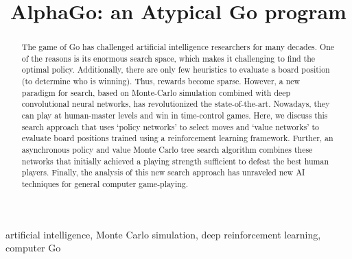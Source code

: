 \documentclass[conference]{IEEEtran}
\begin{document}
\title{AlphaGo: an Atypical Go program}


\author{
}


\maketitle

\begin{abstract}
The game of Go has challenged artificial intelligence researchers for many decades. One of the reasons is its enormous search space, which makes it challenging to find the optimal policy. Additionally, there are only few heuristics to evaluate a board position (to determine who is winning). Thus, rewards become sparse. However, a new paradigm for search, based on Monte-Carlo simulation combined with deep convolutional neural networks, has revolutionized the state-of-the-art. Nowadays, they can play at human-master levels and win in time-control games. Here, we discuss this search approach that uses `policy networks' to select moves and `value networks' to evaluate board positions trained using a reinforcement learning framework. Further, an asynchronous policy and value Monte Carlo tree search algorithm combines these networks that initially achieved a playing strength sufficient to defeat the best human players. Finally, the analysis of this new search approach has unraveled new AI techniques for general computer game-playing.
\end{abstract}

\begin{IEEEkeywords}
artificial intelligence, Monte Carlo simulation, deep reinforcement learning, computer Go
\end{IEEEkeywords}
\end{document}
